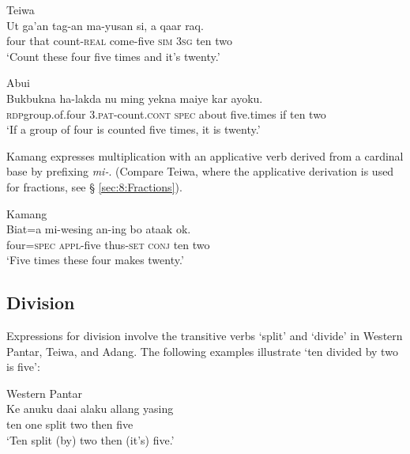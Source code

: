 \ea
\label{ex:8:1244}
{\upshape Teiwa}\\ 
 \gll   Ut  ga'an  tag-an  ma-yusan  si,  a   qaar raq.  \\
    four  that   count-\textsc{real } come-five  \textsc{sim}  \textsc{3sg} ten two  \\
 \glt `Count these four five times and it's twenty.'
\z



\ea
\label{ex:8:1245}
{\upshape Abui}\\ 
 \gll Buk{\Tilde}bukna  ha-lakda  nu  ming  yekna  maiye  kar ayoku. \\
  \textsc{rdp}{\Tilde}group.of.four  \textsc{3.pat}-count.\textsc{cont}  \textsc{spec}  about  five.times  if  ten two  \\
 \glt  `If a group of four is counted five times, it is twenty.'
\z

 

Kamang expresses multiplication with an applicative verb derived from a cardinal base by prefixing \textit{mi-}. (Compare Teiwa, where the applicative derivation is used for fractions, see {\S} \ref{sec:8:Fractions}). 




\ea%
\label{bkm:Ref358043179}
{\upshape Kamang}\\
\gll   Biat=a  mi-wesing  an-ing  bo  ataak   ok.  \\  
    four=\textsc{spec}  \textsc{appl-}five  thus\textsc{-set}  \textsc{conj} ten  two   \\
\glt  `Five times these four makes twenty.'
\z


\subsection{Division}
\label{sec:8:Division}
Expressions for division involve the transitive verbs `split' and `divide' in Western Pantar, Teiwa, and Adang. The following examples illustrate `ten divided by two is five': 


\ea%
\label{bkm:Ref342664493}
{\upshape Western  Pantar}\\
 
\gll   Ke anuku  daai  alaku  allang  yasing\\  
    ten one  split  two  then  five \\
\glt `Ten split (by) two then (it's) five.'
\z




